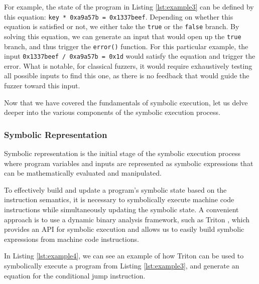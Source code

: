 For example, the state of the program in Listing \ref{lst:example3} can be defined by this equation: \texttt{key * 0xa9a57b = 0x1337beef}. Depending on whether this equation is satisfied or not, we either take the \texttt{true} or the \texttt{false} branch. By solving this equation, we can generate an input that would open up the \texttt{true} branch, and thus trigger the \texttt{error()} function. For this particular example, the input \texttt{0x1337beef / 0xa9a57b = 0x1d} would satisfy the equation and trigger the error. What is notable, for classical fuzzers, it would require exhaustively testing all possible inputs to find this one, as there is no feedback that would guide the fuzzer toward this input.

Now that we have covered the fundamentals of symbolic execution, let us delve deeper into the various components of the symbolic execution process.

\subsubsection{Symbolic Representation}

Symbolic representation is the initial stage of the symbolic execution process where program variables and inputs are represented as symbolic expressions that can be mathematically evaluated and manipulated.

To effectively build and update a program's symbolic state based on the instruction semantics, it is necessary to symbolically execute machine code instructions while simultaneously updating the symbolic state. A convenient approach is to use a dynamic binary analysis framework, such as Triton \cite{triton-sstic2015}, which provides an API for symbolic execution and allows us to easily build symbolic expressions from machine code instructions.

In Listing \ref{lst:example4}, we can see an example of how Triton can be used to symbolically execute a program from Listing \ref{lst:example3}, and generate an equation for the conditional jump instruction.


